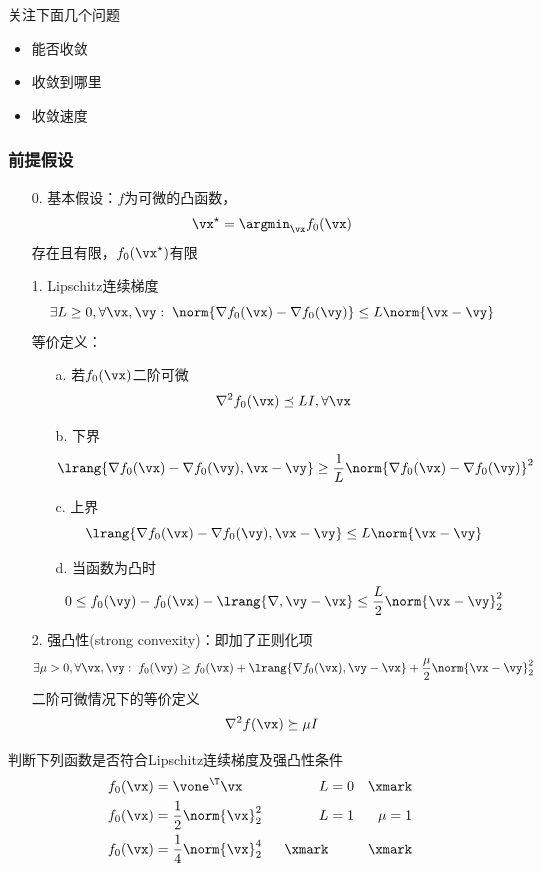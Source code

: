 关注下面几个问题
\begin{itemize}
    \item 能否收敛
    \item 收敛到哪里
    \item 收敛速度
\end{itemize}

\subsubsection{前提假设}
\begin{itemize}
    \item[0.] 基本假设：$f$为可微的凸函数，
    \[\vx^\star=\argmin_\vx f_0(\vx)\]
    存在且有限，$f_0(\vx^\star)$有限
    \item[1.] Lipschitz连续梯度
    \[\exists L\geq 0,\forall \vx,\vy:\;\norm{\nabla f_0(\vx)-\nabla f_0(\vy)}\leq L\norm{\vx-\vy}\]
    等价定义：
    \begin{itemize}
        \item[a.]若$f_0(\vx)$二阶可微
    \[\nabla^2f_0(\vx)\preceq LI,\forall \vx\]
        \item[b.] 下界
    \[\lrang{\nabla f_0(\vx)-\nabla f_0(\vy),\vx-\vy}\geq\frac{1}{L}\norm{\nabla f_0(\vx)-\nabla f_0(\vy)}^2\]
        \item[c.] 上界
    \[\lrang{\nabla f_0(\vx)-\nabla f_0(\vy),\vx-\vy}\leq L\norm{\vx-\vy}\]
        \item[d.] 当函数为凸时
    \[0\leq f_0(\vy)-f_0(\vx)-\lrang{\nabla,\vy-\vx}\leq\frac{L}{2}\norm{\vx-\vy}_2^2\]
    \end{itemize}
    \item[2.] 强凸性(strong convexity)：即加了正则化项
    \[\exists\mu>0,\forall \vx,\vy:\;f_0(\vy)\geq f_0(\vx)+\lrang{\nabla f_0(\vx),\vy-\vx}+\frac{\mu}{2}\norm{\vx-\vy}_2^2\]
    二阶可微情况下的等价定义
    \[\nabla^2 f(\vx)\succeq \mu I\]
\end{itemize}
\begin{example}
    判断下列函数是否符合Lipschitz连续梯度及强凸性条件
    \[\begin{aligned}
        f_0(\vx) &= \vone^\T \vx\qquad & L &= 0 & \text{\xmark}\\
        f_0(\vx) &= \frac{1}{2}\norm{\vx}_2^2 & L &=1 & \mu=1\\
        f_0(\vx) &= \frac{1}{4}\norm{\vx}_2^4 & \text{\xmark} & &\text{\xmark}
    \end{aligned}\]
\end{example}

